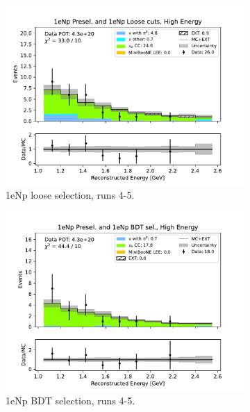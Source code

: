\begin{figure}[H]
\begin{subfigure}{0.33\linewidth}
    \includegraphics[width=\linewidth]{technote/Sidebands/Figures/FarSideband/far_sideband_reco_e_run4b4c4d5_NP_NPL_HIGH_ENERGY.pdf}
    \caption{1eNp loose selection, runs 4-5.}
    \end{subfigure}%
    \begin{subfigure}{0.33\linewidth}
    \includegraphics[width=\linewidth]{technote/Sidebands/Figures/FarSideband/far_sideband_reco_e_run4b4c4d5_NP_NPBDT_HIGH_ENERGY.pdf}
    \caption{1eNp BDT selection, runs 4-5.}
    \end{subfigure}
    \begin{subfigure}{0.33\linewidth}

\end{subfigure}
\end{figure}
